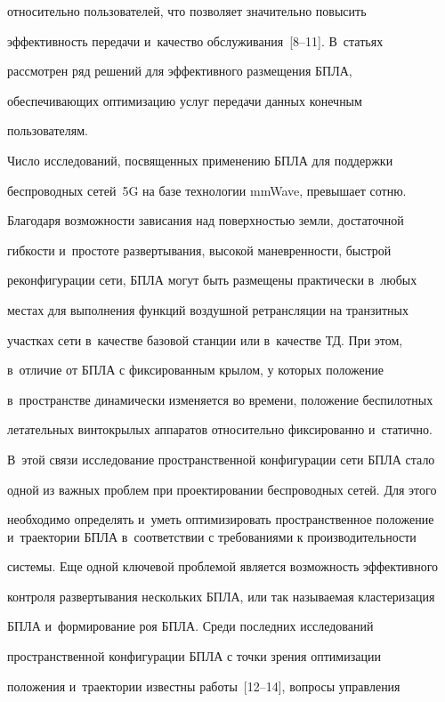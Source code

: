 относительно пользователей, что позволяет значительно повысить 


эффективность передачи и~качество обслуживания~[8--11]. В~статьях 


рассмотрен ряд решений для эффективного размещения БПЛА, 


обеспечивающих оптимизацию услуг передачи данных конечным 


пользователям.


  


   Число исследований, посвященных применению БПЛА для поддержки 


беспроводных сетей~5G на базе технологии mmWave, превышает сотню. 


Благодаря возможности зависания над поверхностью земли, достаточной 


гибкости и~прос\-то\-те развертывания, высокой маневренности, быстрой 


реконфигурации сети, БПЛА могут быть размещены практически в~любых 


местах для выполнения функций воздушной ретрансляции на транзитных 


участках сети в~качестве базовой станции или в~качестве ТД. При этом, 


в~отличие от БПЛА с фиксированным крылом, у которых положение 


в~пространстве динамически изменяется во времени, положение беспилотных 


летательных винтокрылых аппаратов относительно фиксированно и~статично. 


В~этой связи исследование пространственной конфигурации сети БПЛА стало 


одной из важных проблем при проектировании беспроводных сетей. Для этого 


необходимо определять и~уметь оптимизировать пространственное положение и~траектории БПЛА в~соответствии с требованиями к производительности 


системы. Еще одной ключевой проблемой является возможность эффективного 


контроля развертывания нескольких БПЛА, или так называемая кластеризация 


БПЛА и~формирование роя БПЛА. Среди последних исследований 


пространственной конфигурации БПЛА с точки зрения оптимизации 


положения и~траектории известны работы~[12--14], вопросы управления 


